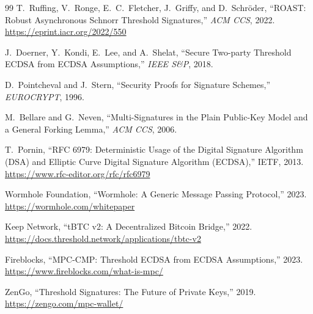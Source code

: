 \documentclass[11pt,twocolumn]{article}
\begin{document}
\begin{thebibliography}{99}
T.~Ruffing, V.~Ronge, E.~C.~Fletcher, J.~Griffy, and D.~Schr\"oder,
``ROAST: Robust Asynchronous Schnorr Threshold Signatures,''
\textit{ACM CCS}, 2022.
\url{https://eprint.iacr.org/2022/550}

J.~Doerner, Y.~Kondi, E.~Lee, and A.~Shelat,
``Secure Two-party Threshold ECDSA from ECDSA Assumptions,''
\textit{IEEE S\&P}, 2018.

D.~Pointcheval and J.~Stern,
``Security Proofs for Signature Schemes,''
\textit{EUROCRYPT}, 1996.

M.~Bellare and G.~Neven,
``Multi-Signatures in the Plain Public-Key Model and a General Forking Lemma,''
\textit{ACM CCS}, 2006.

T.~Pornin,
``RFC 6979: Deterministic Usage of the Digital Signature Algorithm (DSA) and
Elliptic Curve Digital Signature Algorithm (ECDSA),''
IETF, 2013.
\url{https://www.rfc-editor.org/rfc/rfc6979}

Wormhole Foundation,
``Wormhole: A Generic Message Passing Protocol,''
2023.
\url{https://wormhole.com/whitepaper}

Keep Network,
``tBTC v2: A Decentralized Bitcoin Bridge,''
2022.
\url{https://docs.threshold.network/applications/tbtc-v2}

Fireblocks,
``MPC-CMP: Threshold ECDSA from ECDSA Assumptions,''
2023.
\url{https://www.fireblocks.com/what-is-mpc/}

ZenGo,
``Threshold Signatures: The Future of Private Keys,''
2019.
\url{https://zengo.com/mpc-wallet/}

\end{thebibliography}
\end{document}
